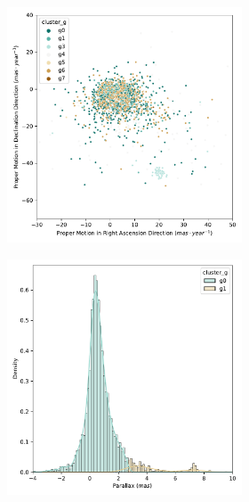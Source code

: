 \documentclass[11pt, a4paper, english]{book}
\begin{document}
\begin{figure}[htbp]
\begin{subfigure}{0.9\textwidth}
\begin{subfigure}[t]{0.3\textwidth}
    \end{subfigure}
    \hfill
    \begin{subfigure}[t]{0.3\textwidth}
      \centering
      \includegraphics[width=\textwidth]{../figures/kmeans_n8_pm_melotte_22.pdf}
    \end{subfigure}
  \end{subfigure}
  \medskip
  \begin{subfigure}{0.9\textwidth}
    \centering
    \begin{subfigure}[t]{0.3\textwidth}
      \centering
      \includegraphics[width=\textwidth]{../figures/kmeans_n2_parallax_melotte_22.pdf}

\end{subfigure}
\end{subfigure}
\end{figure}
\end{document}
